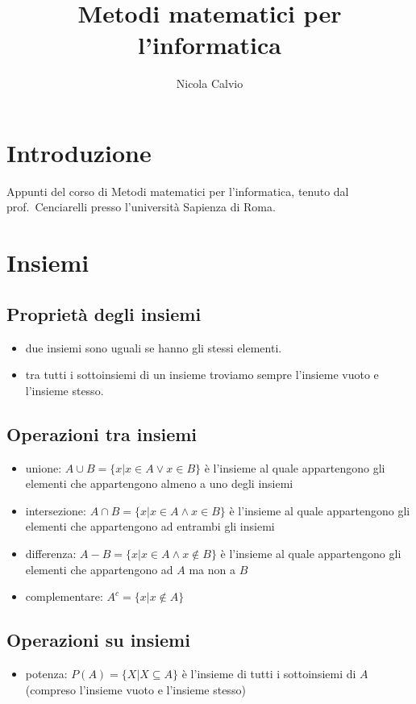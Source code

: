 \documentclass{article}
\title{Metodi matematici per l'informatica}
\author{Nicola Calvio}
\begin{document}
\maketitle

\section{Introduzione}

Appunti del corso di Metodi matematici per l'informatica, tenuto dal prof.~Cenciarelli presso l'università Sapienza di Roma.

\section{Insiemi}

\subsection{Proprietà degli insiemi}
\begin{itemize}
    \item due insiemi sono uguali se hanno gli stessi elementi.
    \item tra tutti i sottoinsiemi di un insieme troviamo sempre l'insieme vuoto e l'insieme stesso.
\end{itemize}

\subsection{Operazioni tra insiemi}
\begin{itemize}
    \item unione: $A \cup B = \{x | x \in A \lor x \in B\}$ è l'insieme al quale appartengono gli elementi che appartengono almeno a uno degli insiemi
    \item intersezione: $A \cap B = \{x | x \in A \land x \in B\}$ è l'insieme al quale appartengono gli elementi che appartengono ad entrambi gli insiemi
    \item differenza: $A - B = \{x | x \in A \land x \notin B\}$ è l'insieme al quale appartengono gli elementi che appartengono ad $A$ ma non a $B$
    \item complementare: $A^c = \{x | x \notin A\}$
\end{itemize}

\subsection{Operazioni su insiemi}
\begin{itemize}
    \item potenza: $P(A) = \{X | X \subseteq A\}$ è l'insieme di tutti i sottoinsiemi di $A$ (compreso l'insieme vuoto e l'insieme stesso)
\end{itemize}
\end{document}
